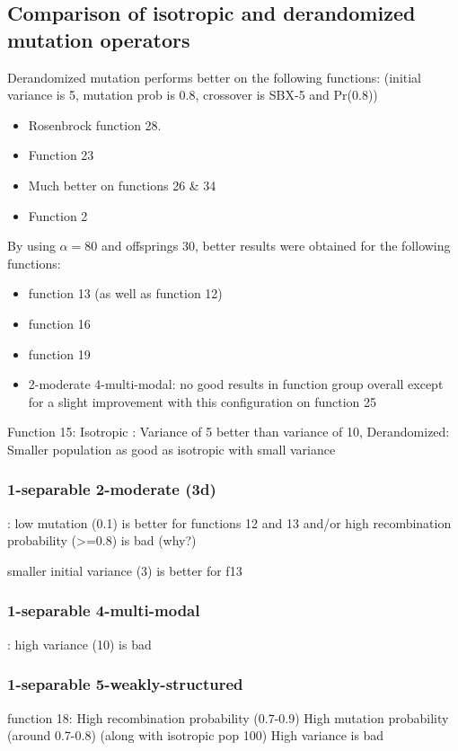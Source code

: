 \documentclass{sig-alternate}
\begin{document}
\subsection{Comparison of isotropic and derandomized mutation operators}
Derandomized mutation performs better on the following functions: (initial variance is 5, mutation prob is 0.8, crossover is  SBX-5 and Pr(0.8))
\begin{itemize}
\item Rosenbrock function 28.
\item Function 23
\item Much better on functions 26 \& 34
\item Function 2
\end{itemize}
By using $\alpha = 80$ and offsprings 30, better results were obtained for the following functions:
\begin{itemize}
\item function 13 (as well as function 12)
\item function 16
\item function 19
\item 2-moderate 4-multi-modal:  no good results in function group overall except for a slight improvement with this configuration on function 25
\end{itemize}

Function 15: Isotropic : Variance of 5 better than variance of 10, 
			 Derandomized: Smaller population as good as isotropic with small variance
			 
\subsubsection*{1-separable 2-moderate (3d)}: 
low mutation (0.1) is better for functions 12 and 13 and/or high recombination probability (>=0.8) is bad (why?)

smaller initial variance (3) is better for f13

\subsubsection*{1-separable 4-multi-modal} : high variance (10) is bad

\subsubsection*{1-separable 5-weakly-structured}
function 18: High recombination probability (0.7-0.9)
			  High mutation probability (around 0.7-0.8)  (along with isotropic pop 100)
			  High variance is bad
\end{document}
